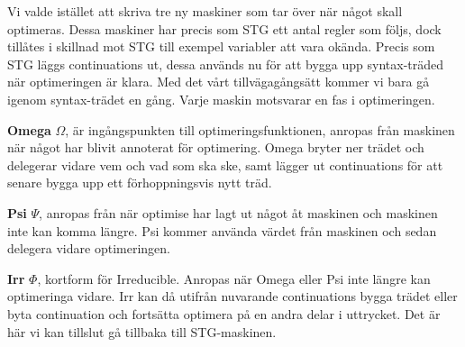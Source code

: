 \documentclass[Rapport]{subfiles}
\begin{document}

Vi valde istället att skriva tre ny maskiner som tar över när något skall optimeras.
Dessa maskiner har precis som STG ett antal regler som följs, dock tillåtes i skillnad mot STG till exempel variabler att 
vara okända. Precis som STG läggs continuations ut, dessa används nu för att bygga upp syntax-träded när optimeringen är klara. Med det vårt tillvägagångsätt kommer vi bara gå igenom syntax-trädet en gång.
Varje maskin motsvarar en fas i optimeringen.


\textbf{Omega} $\Omega$, är ingångspunkten till optimeringsfunktionen, anropas från maskinen
när något har blivit annoterat för optimering. Omega bryter ner trädet
och delegerar vidare vem och vad som ska ske, samt lägger ut continuations
för att senare bygga upp ett förhoppningsvis nytt träd.

\textbf{Psi} $\Psi$, anropas från när optimise har lagt ut något åt maskinen och
maskinen inte kan komma längre. Psi kommer använda värdet från maskinen
och sedan delegera vidare optimeringen.

\textbf{Irr} $\Phi$, kortform för Irreducible. Anropas när Omega eller Psi inte längre
kan optimeringa vidare. Irr kan då utifrån nuvarande continuations
bygga trädet eller byta continuation och fortsätta optimera på en
andra delar i uttrycket. Det är här vi kan tillslut gå tillbaka till
STG-maskinen.
















\end{document}
